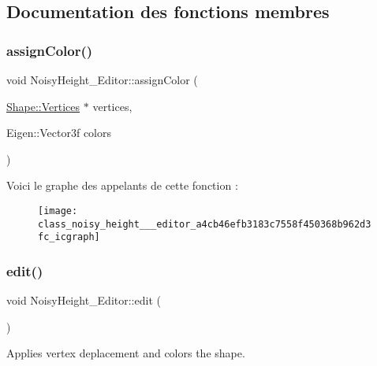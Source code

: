 \subsection{Documentation des fonctions membres}
\mbox{\label{class_noisy_height___editor_a4cb46efb3183c7558f450368b962d3fc}} 
\subsubsection{\texorpdfstring{assign\+Color()}{assignColor()}}
{\footnotesize\ttfamily void Noisy\+Height\+\_\+\+Editor\+::assign\+Color (\begin{DoxyParamCaption}\item[{\hyperlink{struct_shape_1_1_vertices}{Shape\+::\+Vertices} $\ast$}]{vertices,  }\item[{Eigen\+::\+Vector3f}]{colors }\end{DoxyParamCaption})\hspace{0.3cm}{\ttfamily [protected]}}

Voici le graphe des appelants de cette fonction \+:\nopagebreak
\begin{figure}[H]
\begin{center}
\leavevmode
\texttt{[image: class\_noisy\_height\_\_\_editor\_a4cb46efb3183c7558f450368b962d3fc\_icgraph]}
\end{center}
\end{figure}
\mbox{\label{class_noisy_height___editor_a3ed5c7267dec56ff2f21366ce2ae9818}} 
\subsubsection{\texorpdfstring{edit()}{edit()}}
{\footnotesize\ttfamily void Noisy\+Height\+\_\+\+Editor\+::edit (\begin{DoxyParamCaption}{ }\end{DoxyParamCaption})\hspace{0.3cm}{\ttfamily [virtual]}}



Applies vertex deplacement and colors the shape. 



